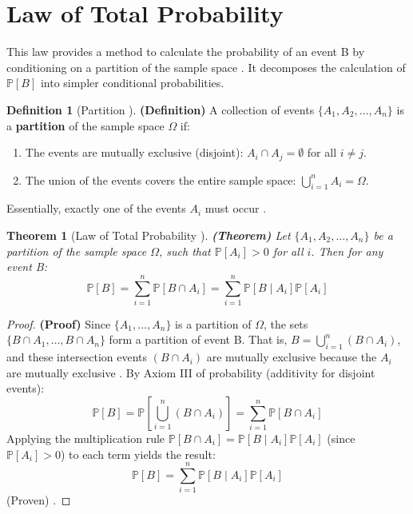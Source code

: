 \documentclass[12pt, a4paper]{article}
\theoremstyle{definition}
\newtheorem{definition}{Definition}[section]
\theoremstyle{plain}
\newtheorem{theorem}{Theorem}[section]
\newcommand{\Prob}[1]{\mathbb{P}\left[#1\right]} %
\newcommand{\condProb}[2]{\mathbb{P}\left[#1 \mid #2\right]} %
\newcommand{\intersect}{\cap} %
\newcommand{\samplespace}{\Omega} %
\newcommand{\emptySet}{\emptyset} %
\begin{document}
\section{Law of Total Probability}

This law provides a method to calculate the probability of an event B by conditioning on a partition of the sample space \cite{FacultyNotes}. It decomposes the calculation of $\Prob{B}$ into simpler conditional probabilities.

\begin{definition}[Partition \cite{FacultyNotes}]
\textbf{(Definition)} A collection of events $\{A_1, A_2, \dots, A_n\}$ is a \textbf{partition} of the sample space $\samplespace$ if:
\begin{enumerate}
    \item The events are mutually exclusive (disjoint): $A_i \intersect A_j = \emptySet$ for all $i \neq j$.
    \item The union of the events covers the entire sample space: $\bigcup_{i=1}^{n} A_i = \samplespace$.
\end{enumerate}
Essentially, exactly one of the events $A_i$ must occur \cite{Ross}.
\end{definition}

\begin{theorem}[Law of Total Probability \cite{Ross, Chan, FacultyNotes}]
\textbf{(Theorem)} Let $\{A_1, A_2, \dots, A_n\}$ be a partition of the sample space $\samplespace$, such that $\Prob{A_i} > 0$ for all $i$. Then for any event B:
\[ \Prob{B} = \sum_{i=1}^{n} \Prob{B \intersect A_i} = \sum_{i=1}^{n} \condProb{B}{A_i}\Prob{A_i} \]
\end{theorem}
\begin{proof}
\textbf{(Proof)} Since $\{A_1, \dots, A_n\}$ is a partition of $\samplespace$, the sets $\{B \intersect A_1, \dots, B \intersect A_n\}$ form a partition of event B. That is, $B = \bigcup_{i=1}^{n} (B \intersect A_i)$, and these intersection events $(B \intersect A_i)$ are mutually exclusive because the $A_i$ are mutually exclusive \cite{FacultyNotes, Chan}.
By Axiom III of probability (additivity for disjoint events):
\[ \Prob{B} = \Prob{\bigcup_{i=1}^{n} (B \intersect A_i)} = \sum_{i=1}^{n} \Prob{B \intersect A_i} \]
Applying the multiplication rule $\Prob{B \intersect A_i} = \condProb{B}{A_i}\Prob{A_i}$ (since $\Prob{A_i} > 0$) to each term yields the result:
\[ \Prob{B} = \sum_{i=1}^{n} \condProb{B}{A_i}\Prob{A_i} \]
(Proven) \cite{FacultyNotes, Chan, Ross}.
\end{proof}
\end{document}
